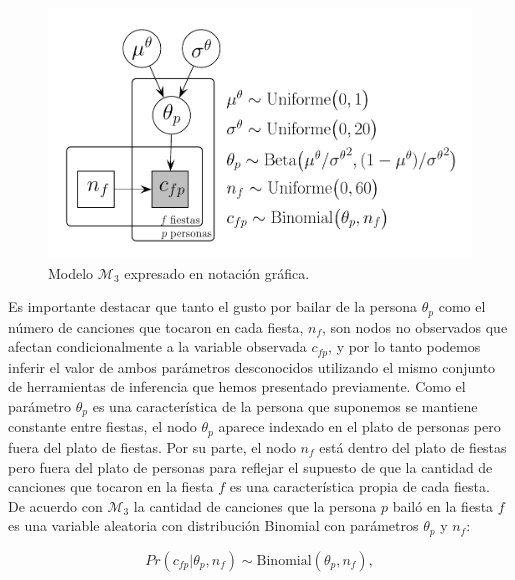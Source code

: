\documentclass{article}
\begin{document}
\begin{figure}[H]
\centerline{\includegraphics[width=1\textwidth]{m_3.pdf}}
\caption{Modelo $\mathcal M_3$ expresado en notación gráfica.}
\label{fig:m_3}
\end{figure}

\indent Es importante destacar que tanto el gusto por bailar de la persona $\theta_p$ como el número de canciones que tocaron en cada fiesta, $n_f$, son nodos no observados que afectan condicionalmente a la variable observada $c_{fp}$, y por lo tanto podemos inferir el valor de ambos parámetros desconocidos utilizando el mismo conjunto de herramientas de inferencia que hemos presentado previamente. Como el parámetro $\theta_p$ es una característica de la persona que suponemos se mantiene constante entre fiestas, el nodo $\theta_p$ aparece indexado en el plato de personas pero fuera del plato de fiestas. Por su parte, el nodo $n_f$ está dentro del plato de fiestas pero fuera del plato de personas para reflejar el supuesto de que la cantidad de canciones que tocaron en la fiesta $f$ es una característica propia de cada fiesta.\\
\indent De acuerdo con $\mathcal M_3$ la cantidad de canciones que la persona $p$ bailó en la fiesta $f$ es una variable aleatoria con distribución Binomial con parámetros $\theta_p$ y $n_f$:

\begin{equation}
Pr(c_{fp}|\theta_p,n_f)\sim \mathrm{Binomial}(\theta_p,n_f)\label{M3_1},
\end{equation}
\end{document}
